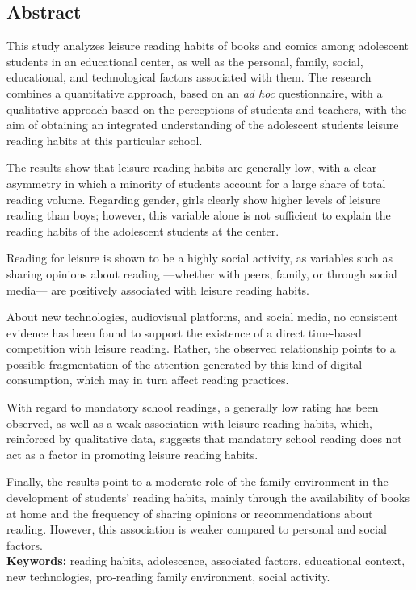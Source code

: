 \documentclass[12pt]{article}
\newcommand{\subsectiononumber}[1]{%
  \subsection*{#1}
  \phantomsection
}
\begin{document}
\newpage
\subsectiononumber{Abstract}
This study analyzes leisure reading habits of books and comics among adolescent students in an educational center, as well as the personal, family, social, educational, and technological factors associated with them. The research combines a quantitative approach, based on an \emph{ad hoc} questionnaire, with a qualitative approach based on the perceptions of students and teachers, with the aim of obtaining an integrated understanding of the adolescent students leisure reading habits at this particular school.

The results show that leisure reading habits are generally low, with a clear asymmetry in which a minority of students account for a large share of total reading volume. Regarding gender, girls clearly show higher levels of leisure reading than boys; however, this variable alone is not sufficient to explain the reading habits of the adolescent students at the center.

Reading for leisure is shown to be a highly social activity, as variables such as sharing opinions about reading ---whether with peers, family, or through social media--- are positively associated with leisure reading habits.

About new technologies, audiovisual platforms, and social media, no consistent evidence has been found to support the existence of a direct time-based competition with leisure reading. Rather, the observed relationship points to a possible fragmentation of the attention generated by this kind of digital consumption, which may in turn affect reading practices.

With regard to mandatory school readings, a generally low rating has been observed, as well as a weak association with leisure reading habits, which, reinforced by qualitative data, suggests that mandatory school reading does not act as a factor in promoting leisure reading habits.

Finally, the results point to a moderate role of the family environment in the development of students’ reading habits, mainly through the availability of books at home and the frequency of sharing opinions or recommendations about reading. However, this association is weaker compared to personal and social factors.
\\[4ex]
\textbf{Keywords:} reading habits, adolescence, associated factors, educational context, new technologies, pro-reading family environment, social activity.
\end{document}

